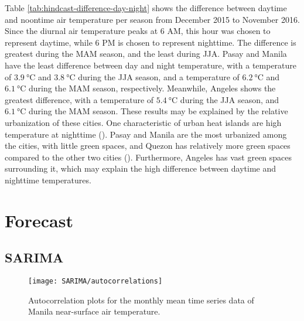 		Table \ref{tab:hindcast-difference-day-night} shows the difference between daytime and noontime air temperature per season from December 2015 to November 2016.
		Since the diurnal air temperature peaks at 6 AM, this hour was chosen to represent daytime, while 6 PM is chosen to represent nighttime.
		The difference is greatest during the MAM season, and the least during JJA.
		Pasay and Manila have the least difference between day and night temperature,
			with a temperature of $\qty{3.9}{\degreeCelsius}$ and $\qty{3.8}{\degreeCelsius}$ during the JJA season,
			and a temperature of $\qty{6.2}{\degreeCelsius}$ and $\qty{6.1}{\degreeCelsius}$ during the MAM season,
			respectively.
		Meanwhile, Angeles shows the greatest difference, with a temperature of $\qty{5.4}{\degreeCelsius}$ during the JJA season, and $\qty{6.1}{\degreeCelsius}$ during the MAM season.
		These results may be explained by the relative urbanization of these cities.
		One characteristic of urban heat islands are high temperature at nighttime (\cite{Oke2017urban}).
		Pasay and Manila are the most urbanized among the cities, with little green spaces,
			and Quezon has relatively more green spaces compared to the other two cities (\cite{Bilang2022}).
		Furthermore, Angeles has vast green spaces surrounding it, which may explain the high difference between daytime and nighttime temperatures.
	
\section{Forecast}
	\subsection{SARIMA}
		
		\begin{figure}
			\centering
			\texttt{[image: SARIMA/autocorrelations]}
			\caption{
				Autocorrelation plots for the monthly mean time series data of Manila near-surface air temperature.
			}
			\label{fig:sarima-autocorrelations}
		\end{figure}	
		
